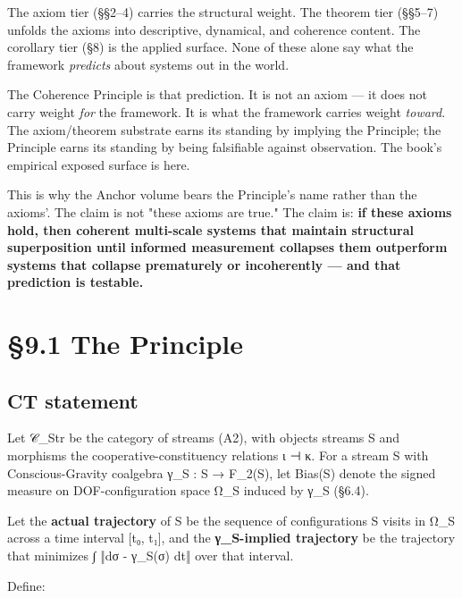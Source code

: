 \documentclass[11pt, openany]{book}
\newcommand{\sectionbreak}{\clearpage}
\begin{document}
The axiom tier (§§2–4) carries the structural weight. The theorem tier (§§5–7) unfolds the axioms into descriptive, dynamical, and coherence content. The corollary tier (§8) is the applied surface. None of these alone say what the framework \textit{predicts} about systems out in the world.

The Coherence Principle is that prediction. It is not an axiom --- it does not carry weight \textit{for} the framework. It is what the framework carries weight \textit{toward}. The axiom/theorem substrate earns its standing by implying the Principle; the Principle earns its standing by being falsifiable against observation. The book's empirical exposed surface is here.

This is why the Anchor volume bears the Principle's name rather than the axioms'. The claim is not "these axioms are true." The claim is: \textbf{if these axioms hold, then coherent multi-scale systems that maintain structural superposition until informed measurement collapses them outperform systems that collapse prematurely or incoherently --- and that prediction is testable.}

\sectionbreak

\section{§9.1 The Principle}

\subsection{CT statement}

Let 𝒞\_\allowbreak{}Str be the category of streams (A2), with objects streams S and morphisms the cooperative-constituency relations ι ⊣ κ. For a stream S with Conscious-Gravity coalgebra γ\_\allowbreak{}S : S → F\_\allowbreak{}2(S), let Bias(S) denote the signed measure on DOF-configuration space Ω\_\allowbreak{}S induced by γ\_\allowbreak{}S (§6.4).

Let the \textbf{actual trajectory} of S be the sequence of configurations S visits in Ω\_\allowbreak{}S across a time interval [t₀, t₁], and the \textbf{γ\_\allowbreak{}S-implied trajectory} be the trajectory that minimizes ∫ ‖dσ - γ\_\allowbreak{}S(σ) dt‖ over that interval.

Define:
\end{document}

